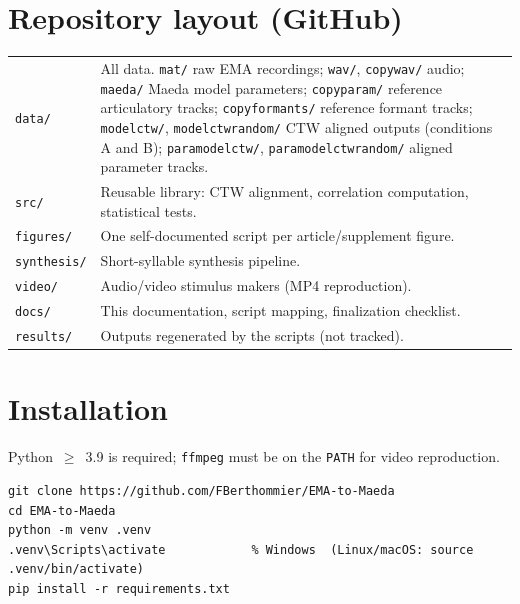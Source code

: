 \documentclass[11pt,a4paper]{article}
\begin{document}
\section{Repository layout (GitHub)}
\begin{longtable}{p{4.2cm}p{10.5cm}}
\texttt{data/} & All data. \texttt{mat/} raw EMA recordings; \texttt{wav/},
\texttt{copywav/} audio; \texttt{maeda/} Maeda model parameters;
\texttt{copyparam/} reference articulatory tracks; \texttt{copyformants/}
reference formant tracks; \texttt{modelctw/}, \texttt{modelctwrandom/} CTW
aligned outputs (conditions A and B); \texttt{paramodelctw/},
\texttt{paramodelctwrandom/} aligned parameter tracks.\\
\texttt{src/} & Reusable library: CTW alignment, correlation computation,
statistical tests.\\
\texttt{figures/} & One self-documented script per article/supplement figure.\\
\texttt{synthesis/} & Short-syllable synthesis pipeline.\\
\texttt{video/} & Audio/video stimulus makers (MP4 reproduction).\\
\texttt{docs/} & This documentation, script mapping, finalization checklist.\\
\texttt{results/} & Outputs regenerated by the scripts (not tracked).\\
\end{longtable}

\section{Installation}
Python~$\geq$~3.9 is required; \texttt{ffmpeg} must be on the \texttt{PATH}
for video reproduction.
\begin{lstlisting}
git clone https://github.com/FBerthommier/EMA-to-Maeda
cd EMA-to-Maeda
python -m venv .venv
.venv\Scripts\activate            % Windows  (Linux/macOS: source .venv/bin/activate)
pip install -r requirements.txt
\end{lstlisting}
\end{document}
